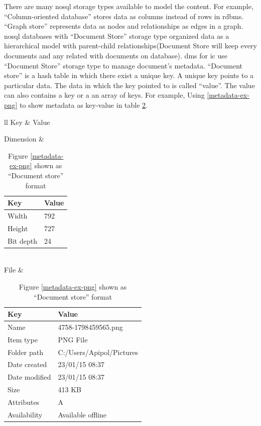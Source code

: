 There are many \gls{nosql} storage types available to model the content.
For example, \enquote{Column-oriented database} stores data as columns instead of rows in \gls{rdbms}.
\enquote{Graph store} represents data as nodes and relationships as edges in a graph.
\gls{nosql} databases with \enquote{Document Store} storage type organized data as a hierarchical model with parent-child relationships(Document Store will keep every documents and any related with documents on database).
\gls{dms} for \gls{ic} use \enquote{Document Store} storage type to manage document's metadata. %
\enquote{Document store} is a hash table in which there exist a unique key.
A unique key points to a particular data.
The data in which the key pointed to is called \enquote{value}.
The value can also contains a key or a an array of keys.
For example, Using \ref{metadata-ex-png} to show metadata as key-value in table \ref{tbl:ex-metadata-key-value}.
\begin{table}
	\centering
	\caption{Figure \ref{metadata-ex-png} shown as \enquote{Document store} format}
	\label{tbl:ex-metadata-key-value}
	\begin{tabular}{ll}
		\hline
		Key & Value \\
		\hline
		
		Dimension & 
		\begin{tabular}{ll}
			Key & Value \\
			\hline
			Width & 792 \\
			Height & 727 \\
			Bit depth & 24 \\
			
		\end{tabular} \\
		
		File & 
		\begin{tabular}{ll}
			\hline
			Key & Value \\
			\hline
			Name & 4758-1798459565.png \\
			Item type & PNG File \\
			Folder path & C:/Users/Apipol/Pictures \\
			Date created & 23/01/15 08:37 \\
			Date modified & 23/01/15 08:37 \\
			Size & 413 KB \\
			Attributes & A \\
			Availability & Available offline \\
			
		\end{tabular} \\
		
		\hline
	\end{tabular}
\end{table}


